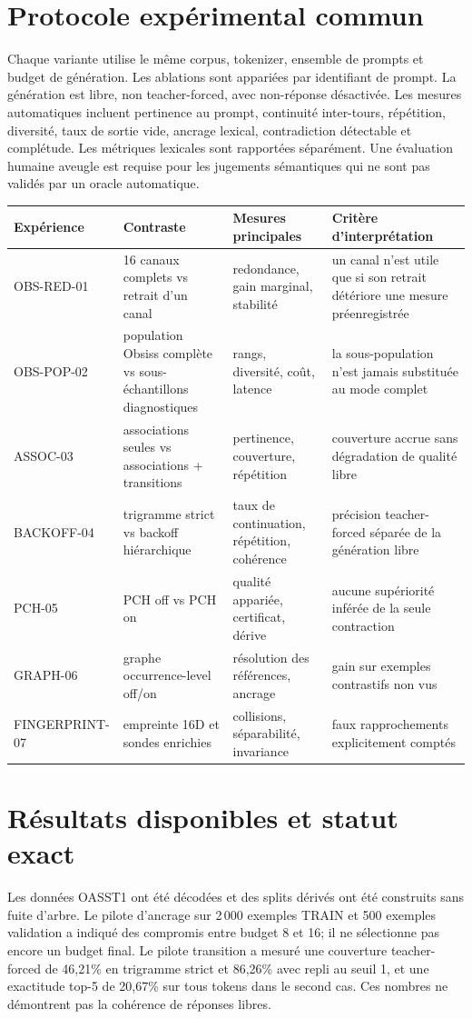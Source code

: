 \documentclass[11pt,a4paper]{report}
\begin{document}
\chapter{Protocole expérimental commun}
Chaque variante utilise le même corpus, tokenizer, ensemble de prompts et budget de génération. Les ablations sont appariées par identifiant de prompt. La génération est libre, non teacher-forced, avec non-réponse désactivée. Les mesures automatiques incluent pertinence au prompt, continuité inter-tours, répétition, diversité, taux de sortie vide, ancrage lexical, contradiction détectable et complétude. Les métriques lexicales sont rapportées séparément. Une évaluation humaine aveugle est requise pour les jugements sémantiques qui ne sont pas validés par un oracle automatique.

\begin{longtable}{p{.14\linewidth}p{.29\linewidth}p{.27\linewidth}p{.22\linewidth}}
\toprule Expérience & Contraste & Mesures principales & Critère d'interprétation \\
\midrule
OBS-RED-01 & 16 canaux complets vs retrait d'un canal & redondance, gain marginal, stabilité & un canal n'est utile que si son retrait détériore une mesure préenregistrée \\
OBS-POP-02 & population Obsiss complète vs sous-échantillons diagnostiques & rangs, diversité, coût, latence & la sous-population n'est jamais substituée au mode complet \\
ASSOC-03 & associations seules vs associations + transitions & pertinence, couverture, répétition & couverture accrue sans dégradation de qualité libre \\
BACKOFF-04 & trigramme strict vs backoff hiérarchique & taux de continuation, répétition, cohérence & précision teacher-forced séparée de la génération libre \\
PCH-05 & PCH off vs PCH on & qualité appariée, certificat, dérive & aucune supériorité inférée de la seule contraction \\
GRAPH-06 & graphe occurrence-level off/on & résolution des références, ancrage & gain sur exemples contrastifs non vus \\
FINGERPRINT-07 & empreinte 16D et sondes enrichies & collisions, séparabilité, invariance & faux rapprochements explicitement comptés \\
\bottomrule
\end{longtable}

\chapter{Résultats disponibles et statut exact}
Les données OASST1 ont été décodées et des splits dérivés ont été construits sans fuite d'arbre. Le pilote d'ancrage sur 2\,000 exemples TRAIN et 500 exemples validation a indiqué des compromis entre budget 8 et 16; il ne sélectionne pas encore un budget final. Le pilote transition a mesuré une couverture teacher-forced de 46,21\% en trigramme strict et 86,26\% avec repli au seuil 1, et une exactitude top-5 de 20,67\% sur tous tokens dans le second cas. Ces nombres ne démontrent pas la cohérence de réponses libres.
\end{document}
